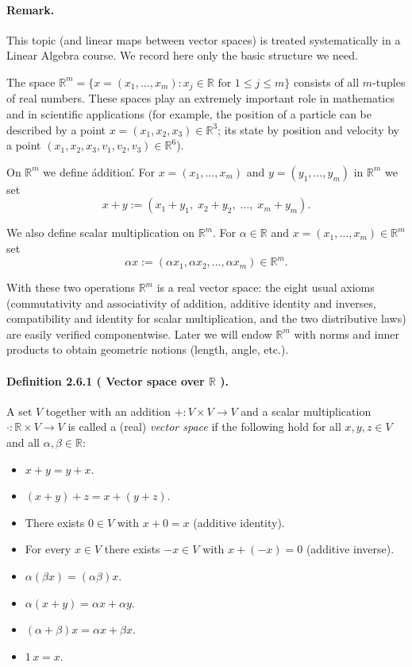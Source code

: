 \documentclass[12pt,a4paper]{article}
\newcommand{\R}{\mathbb{R}}
\newcommand{\NumberedDefinition}[3]{%
\paragraph*{Definition #1 ( #2 ).} #3\par}
\theoremstyle{plain}
\theoremstyle{definition}
\theoremstyle{remark}
\begin{document}
\paragraph{Remark.} This topic (and linear maps between vector spaces) is treated systematically in a Linear Algebra course. We record here only the basic structure we need.

The space $\R^m = \{ x = (x_1,\dots,x_m) : x_j\in\R \text{ for } 1\le j\le m \}$ consists of all $m$-tuples of real numbers. These spaces play an extremely important role in mathematics and in scientific applications (for example, the position of a particle can be described by a point $x=(x_1,x_2,x_3)\in\R^3$; its state by position and velocity by a point $(x_1,x_2,x_3,v_1,v_2,v_3)\in\R^6$).

On $\R^m$ we define \'addition\'. For $x=(x_1,\dots,x_m)$ and $y=(y_1,\dots,y_m)$ in $\R^m$ we set
\[
	x+y := (x_1+y_1,\; x_2+y_2,\; \dots,\; x_m+y_m).
\]

We also define scalar multiplication on $\R^m$. For $\alpha\in\R$ and $x=(x_1,\dots,x_m)\in\R^m$ set
\[
	\alpha x := (\alpha x_1,\alpha x_2,\dots,\alpha x_m) \in \R^m.
\]

With these two operations $\R^m$ is a real vector space: the eight usual axioms (commutativity and associativity of addition, additive identity and inverses, compatibility and identity for scalar multiplication, and the two distributive laws) are easily verified componentwise. Later we will endow $\R^m$ with norms and inner products to obtain geometric notions (length, angle, etc.).

\NumberedDefinition{2.6.1}{Vector space over $\R$}{A set $V$ together with an addition $+ : V\times V\to V$ and a scalar multiplication $\cdot : \R\times V\to V$ is called a (real) \emph{vector space} if the following hold for all $x,y,z\in V$ and all $\alpha,\beta\in\R$:
\begin{itemize}[leftmargin=*]
	\item $x+y = y+x$.
	\item $(x+y)+z = x+(y+z)$.
	\item There exists $0\in V$ with $x+0 = x$ (additive identity).
	\item For every $x\in V$ there exists $-x\in V$ with $x+(-x)=0$ (additive inverse).
	\item $\alpha(\beta x) = (\alpha\beta)x$.
	\item $\alpha(x+y) = \alpha x + \alpha y$.
	\item $(\alpha+\beta)x = \alpha x + \beta x$.
	\item $1\,x = x$.
\end{itemize}}
\end{document}
